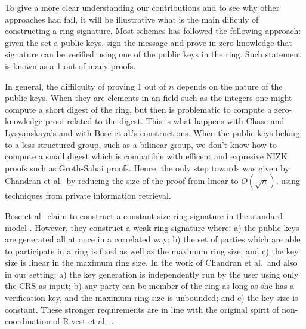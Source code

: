 
To give a more clear understanding our contributions and to see why other approaches had fail, it will be illustrative what is the main dificuly of constructing a ring signature. Most schemes has followed the following approach: given the set a public keys, sign the message and prove in zero-knowledge that signature can be verified using one of the public keys in the ring. Such statement is known as a 1 out of many proofs.

In general, the diffilculty of proving 1 out of $n$ depends on the nature of the public keys. When they are elements in an field such as the integers one might compute a short digest of the ring, but then is problematic to compute a zero-knowledge proof related to the digest. This is what happens with Chase and Lysyanskaya's and with Bose et al.'s constructions. When  the public keys belong to a less structured group, such as a bilinear group, we don't know how to compute a small digest which is compatible with efficent and expresive NIZK proofs such as Groth-Sahai proofs. Hence, the only step towards was given by Chandran et al.~by reducing the size of the proof from linear to $O(\sqrt{n})$, using techniques from private information retrieval.

Bose et al.~claim to construct a constant-size ring signature in the standard model \cite{ACISP:BosDasRan15}. However, they construct a weak ring signature where: a) the public keys are generated all at once in a correlated way; b) the set of parties which are able to participate in a ring is fixed as well as the maximum ring size; and c) the key size is linear in the maximum ring size. In the work of Chandran et al.~and also in our setting: a) the key generation is independently run by the user using only the CRS as input; b) any party can be member of the ring as long as she has a verification key, and the maximum ring size is unbounded; and c) the key size is constant. These stronger requirements are in line with the original spirit of {non-coordination} of  Rivest et al.~\cite{AC:RivShaTau01}.

